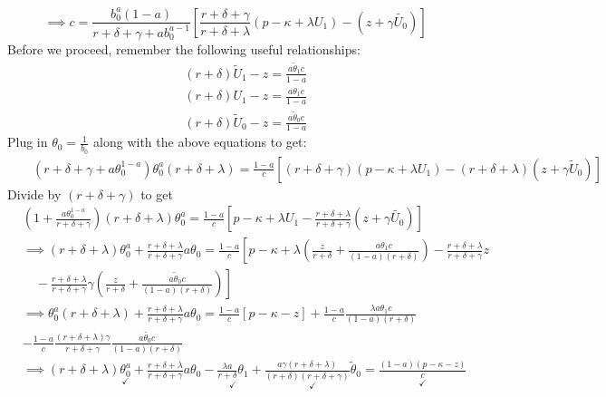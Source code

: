 \documentclass[12pt]{article} %
\theoremstyle{definition}
\begin{document}
\begin{equation}
\implies c =  \frac{b_0^a(1-a)}{r+\delta+\gamma+ab_0^{a-1}}\left[\frac{r+\delta+\gamma}{r+\delta+\lambda}(p-\kappa+\lambda U_1) - (z+\gamma \tilde{U_0}) \right] \label{eq0} \tag{EQ0}    
\end{equation}
Before we proceed, remember the following useful relationships: 
\begin{eqnarray*}
&& (r+\delta)\tilde{U}_1-z = \frac{a \tilde{\theta}_1c}{1-a} \\
&& (r+\delta)U_1-z = \frac{a \theta_1c}{1-a} \\
&& (r+\delta)\tilde{U}_0-z = \frac{a \tilde{\theta}_0c}{1-a} 
\end{eqnarray*}
Plug in $\theta_0 = \frac{1}{b_0}$ along with the above equations to get:
\begin{eqnarray*}
&& (r+\delta+\gamma+a\theta_0^{1-a})\theta_0^a(r+\delta+\lambda) = \frac{1-a}{c} [(r+\delta+\gamma)(p-\kappa+\lambda U_1) - (r+\delta+\lambda)(z+\gamma \tilde{U}_0)]
\end{eqnarray*}
Divide by $(r+\delta+\gamma)$ to get
\begin{align*}
& \left(1+\frac{a\theta_0^{1-a}}{r+\delta+\gamma}\right)(r+\delta+\lambda)\theta_0^a = \frac{1-a}{c} \left[p-\kappa+\lambda U_1 
 - \frac{r+\delta+\lambda}{r+\delta+\gamma}(z+\gamma \tilde{U_0}) \right] \\
&\implies (r+\delta+\lambda) \theta_0^a + \frac{r+\delta+\lambda}{r+\delta+\gamma} a \theta_0 = \frac{1-a}{c} \left[p - \kappa + \lambda \left( \frac{z}{r+\delta} + \frac{a \theta_1 c}{(1-a)(r+\delta)} \right) - \frac{r+\delta+\lambda}{r+\delta+\gamma} z \right. \\
& \left. \quad - \frac{r+\delta+\lambda}{r+\delta+\gamma} \gamma \left( \frac{z}{r+\delta} + \frac{a \tilde{\theta}_0 c}{(1-a)(r+\delta)} \right) \right] \\
&\implies \theta_0^a (r+\delta+\lambda) + \frac{r+\delta+\lambda}{r+\delta+\gamma} a \theta_0 = \frac{1-a}{c} [p - \kappa - z] + \frac{1-a}{c} \frac{\lambda a \theta_1 c}{(1-a)(r+\delta)} \\
& - \frac{1-a}{c}\frac{(r+\delta+\lambda)\gamma}{r+\delta+\gamma} \frac{a \tilde{\theta_0}c}{(1-a)(r+\delta)}\\
& \implies (r+\delta+\lambda) \underset{\checkmark}{\theta_0^a} + \frac{r+\delta+\lambda}{r+\delta+\gamma} a \theta_0 - \underset{\checkmark}{\frac{\lambda a}{r+\delta}\theta_1} + \underset{\checkmark}{\frac{a\gamma(r+\delta+\lambda)}{(r+\delta)(r+\delta+\gamma)}\tilde{\theta}_0} = \underset{\checkmark}{\frac{(1-a)(p-\kappa-z)}{c}}
\end{align*}
\end{document}

